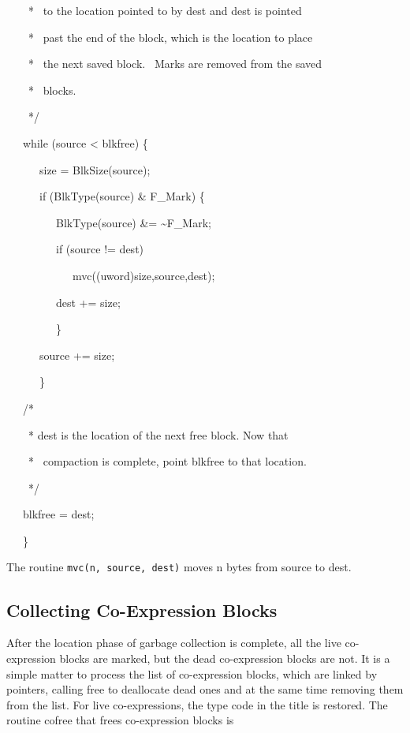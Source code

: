 {\ttfamily\mdseries
\ \ \ \ * \ to the location pointed to by dest and dest is pointed}

{\ttfamily\mdseries
\ \ \ \ * \ past the end of the block, which is the location to place}

{\ttfamily\mdseries
\ \ \ \ * \ the next saved block. \ Marks are removed from the saved}

{\ttfamily\mdseries
\ \ \ \ * \ blocks.}

{\ttfamily\mdseries
\ \ \ \ */
}

{\ttfamily\mdseries
\ \ \ while (source {\textless} blkfree) \{
}

{\ttfamily\mdseries
\ \ \ \ \ \ size = BlkSize(source);
}

{\ttfamily\mdseries
\ \ \ \ \ \ if (BlkType(source) \& F\_Mark) \{
}

{\ttfamily\mdseries
\ \ \ \ \ \ \ \ \ BlkType(source) \&= \~{}F\_Mark;
}

{\ttfamily\mdseries
\ \ \ \ \ \ \ \ \ if (source != dest)
}

{\ttfamily\mdseries
\ \ \ \ \ \ \ \ \ \ \ \ mvc((uword)size,source,dest);
}

{\ttfamily\mdseries
\ \ \ \ \ \ \ \ \ dest += size;
}

{\ttfamily\mdseries
\ \ \ \ \ \ \ \ \ \}
}

{\ttfamily\mdseries
\ \ \ \ \ \ source += size;
}

{\ttfamily\mdseries
\ \ \ \ \ \ \}
}


\bigskip

{\ttfamily\mdseries
\ \ \ /*
}

{\ttfamily\mdseries
\ \ \ \ * dest is the location of the next free block. Now that}

{\ttfamily\mdseries
\ \ \ \ * \ compaction is complete, point blkfree to that location.
}

{\ttfamily\mdseries
\ \ \ \ */
}

{\ttfamily\mdseries
\ \ \ blkfree = dest;
}

{\ttfamily\mdseries
\ \ \ \}}

The routine \texttt{mvc(n, source, dest)} moves n bytes from source to dest.

\subsection{Collecting Co-Expression Blocks}

After the location phase of garbage collection is complete, all the
live co-expression blocks are marked, but the dead co-expression
blocks are not. It is a simple matter to process the list of
co-expression blocks, which are linked by pointers, calling free to
deallocate dead ones and at the same time removing them from the
list. For live co-expressions, the type code in the title is
restored. The routine cofree that frees co-expression blocks is

